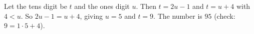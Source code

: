 Let the tens digit be $t$ and the ones digit $u$. Then $t=2u-1$ and $t=u+4$ with $4<u$. So $2u-1=u+4$, giving $u=5$ and $t=9$. The number is $\boxed{95}$ (check: $9=1\cdot5+4$).
